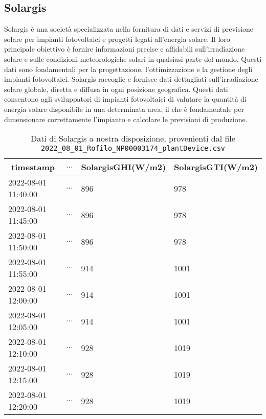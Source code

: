 \subsection{Solargis}
Solargis è una società specializzata nella fornitura di dati e servizi di
previsione solare per impianti fotovoltaici e progetti legati all'energia
solare. Il loro principale obiettivo è fornire informazioni precise e affidabili
sull'irradiazione solare e sulle condizioni meteorologiche solari in qualsiasi
parte del mondo. Questi dati sono fondamentali per la progettazione,
l'ottimizzazione e la gestione degli impianti fotovoltaici.
Solargis raccoglie e fornisce dati dettagliati
sull'irradiazione solare globale, diretta e diffusa in ogni posizione
geografica. Questi dati consentono agli sviluppatori di impianti fotovoltaici di
valutare la quantità di energia solare disponibile in una determinata area, il
che è fondamentale per dimensionare correttamente l'impianto e calcolare le
previsioni di produzione.

\begin{table}[H]
	\begin{center}
		\begin{tabular}[c]{l|l|l|l}
			\hline
			\multicolumn{1}{c|}{\textbf{timestamp}}         &
			\multicolumn{1}{c|}{\textbf{$\ldots$}}          &
			\multicolumn{1}{c|}{\textbf{SolargisGHI(W/m2)}} &
			\multicolumn{1}{c}{\textbf{SolargisGTI(W/m2)}}                          \\
			\hline
			2022-08-01 11:40:00                             & $\ldots$ & 896 & 978  \\
			2022-08-01 11:45:00                             & $\ldots$ & 896 & 978  \\
			2022-08-01 11:50:00                             & $\ldots$ & 896 & 978  \\
			2022-08-01 11:55:00                             & $\ldots$ & 914 & 1001 \\
			2022-08-01 12:00:00                             & $\ldots$ & 914 & 1001 \\
			2022-08-01 12:05:00                             & $\ldots$ & 914 & 1001 \\
			2022-08-01 12:10:00                             & $\ldots$ & 928 & 1019 \\
			2022-08-01 12:15:00                             & $\ldots$ & 928 & 1019 \\
			2022-08-01 12:20:00                             & $\ldots$ & 928 & 1019 \\

			\hline
		\end{tabular}
		\caption{Dati di Solargis a nostra disposizione, provenienti dal file
			\texttt{2022\_08\_01\_Rofilo\_NP00003174\_plantDevice.csv}}\label{tab:solargis}
	\end{center}
\end{table}

